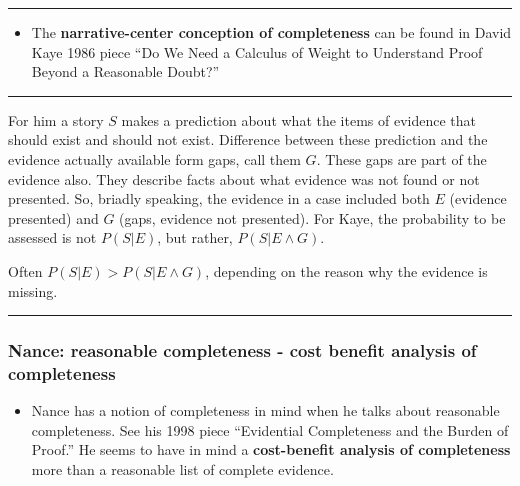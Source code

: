 \documentclass[
  10pt,
  dvipsnames,enabledeprecatedfontcommands]{scrartcl}
\providecommand{\tightlist}{%
  \setlength{\itemsep}{0pt}\setlength{\parskip}{0pt}}
\begin{document}
\begin{center}\rule{0.5\linewidth}{0.5pt}\end{center}

\begin{itemize}
\tightlist
\item
  The \textbf{narrative-center conception of completeness} can be found
  in David Kaye 1986 piece ``Do We Need a Calculus of Weight to
  Understand Proof Beyond a Reasonable Doubt?''
\end{itemize}

\begin{center}\rule{0.5\linewidth}{0.5pt}\end{center}

For him a story \(S\) makes a prediction about what the items of
evidence that should exist and should not exist. Difference between
these prediction and the evidence actually available form gaps, call
them \(G\). These gaps are part of the evidence also. They describe
facts about what evidence was not found or not presented. So, briadly
speaking, the evidence in a case included both \(E\) (evidence
presented) and \(G\) (gaps, evidence not presented). For Kaye, the
probability to be assessed is not \(P(S \vert E)\), but rather,
\(P(S \vert E \wedge G)\).

Often \(P(S \vert E) > P(S \vert E \wedge G)\), depending on the reason
why the evidence is missing.


\begin{center}\rule{0.5\linewidth}{0.5pt}\end{center}

\hypertarget{nance-reasonable-completeness---cost-benefit-analysis-of-completeness}{%
\subsubsection{Nance: reasonable completeness - cost benefit analysis of
completeness}\label{nance-reasonable-completeness---cost-benefit-analysis-of-completeness}}

\begin{itemize}
\tightlist
\item
  Nance has a notion of completeness in mind when he talks about
  reasonable completeness. See his 1998 piece ``Evidential Completeness
  and the Burden of Proof.'' He seems to have in mind a
  \textbf{cost-benefit analysis of completeness} more than a reasonable
  list of complete evidence.
\end{itemize}
\end{document}
